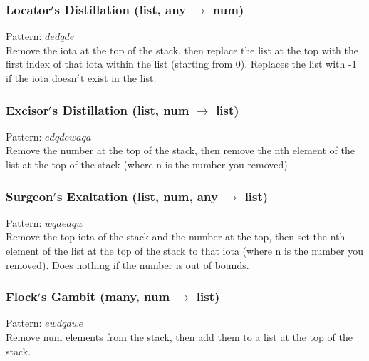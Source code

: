 \documentclass[12pt]{article}
\begin{document}
  \label{sec: patterns/lists@hexcasting:index_of}
\subsubsection*{Locator$\rq$s Distillation (list, any $\rightarrow$ num)}

    Pattern: $dedqde$\\
      Remove the iota at the top of the stack, then replace the list at the top with the first index of that iota within the list (starting from 0). Replaces the list with -1 if the iota doesn$\rq$t exist in the list.\\


  \label{sec: patterns/lists@hexcasting:remove_from}
\subsubsection*{Excisor$\rq$s Distillation (list, num $\rightarrow$ list)}

    Pattern: $edqdewaqa$\\
      Remove the number at the top of the stack, then remove the nth element of the list at the top of the stack (where n is the number you removed).\\


  \label{sec: patterns/lists@hexcasting:replace}
\subsubsection*{Surgeon$\rq$s Exaltation (list, num, any $\rightarrow$ list)}

    Pattern: $wqaeaqw$\\
      Remove the top iota of the stack and the number at the top, then set the nth element of the list at the top of the stack to that iota (where n is the number you removed). Does nothing if the number is out of bounds.\\


  \label{sec: patterns/lists@hexcasting:last_n_list}
\subsubsection*{Flock$\rq$s Gambit (many, num $\rightarrow$ list)}

    Pattern: $ewdqdwe$\\
      Remove num elements from the stack, then add them to a list at the top of the stack.\\


  \label{sec: patterns/lists@hexcasting:splat}
\end{document}
